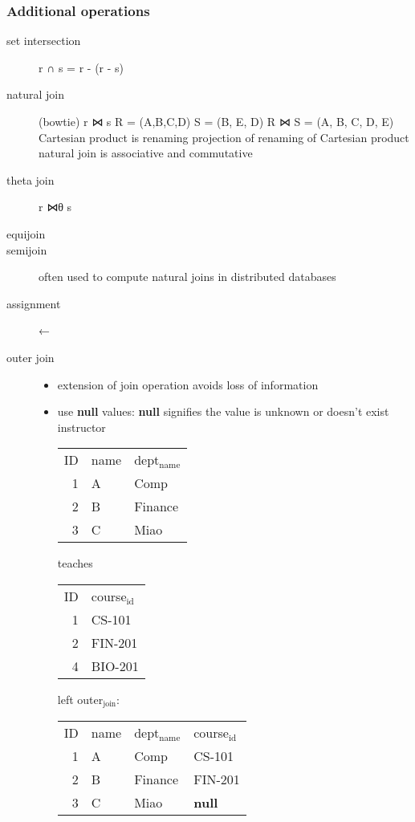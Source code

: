 \documentclass[11pt]{article}
\begin{document}
\subsubsection{Additional operations}
\label{sec-4-1-7}
\begin{description}
\item[{set intersection}] r ∩ s = r - (r - s)
\item[{natural join}] (bowtie)
r ⋈ s
R = (A,B,C,D) S = (B, E, D) R ⋈ S = (A, B, C, D, E)
Cartesian product is renaming
projection of renaming of Cartesian product
natural join is associative and commutative
\item[{theta join}] r ⋈θ s
\item[{equijoin}] 
\item[{semijoin}] often used to compute natural joins in distributed databases
\item[{assignment}] ←
\item[{outer join}] \begin{itemize}
\item extension of join operation avoids loss of information
\item use \textbf{null} values:
\textbf{null} signifies the value is unknown or doesn't exist
instructor
\begin{center}
\begin{tabular}{rll}
ID & name & dept$_{\text{name}}$\\
1 & A & Comp\\
2 & B & Finance\\
3 & C & Miao\\
\end{tabular}
\end{center}
teaches
\begin{center}
\begin{tabular}{rl}
ID & course$_{\text{id}}$\\
1 & CS-101\\
2 & FIN-201\\
4 & BIO-201\\
\end{tabular}
\end{center}
left outer$_{\text{join}}$:
\begin{center}
\begin{tabular}{rlll}
ID & name & dept$_{\text{name}}$ & course$_{\text{id}}$\\
1 & A & Comp & CS-101\\
2 & B & Finance & FIN-201\\
3 & C & Miao & \textbf{null}\\

\end{tabular}
\end{center}
\end{itemize}
\end{description}
\end{document}
